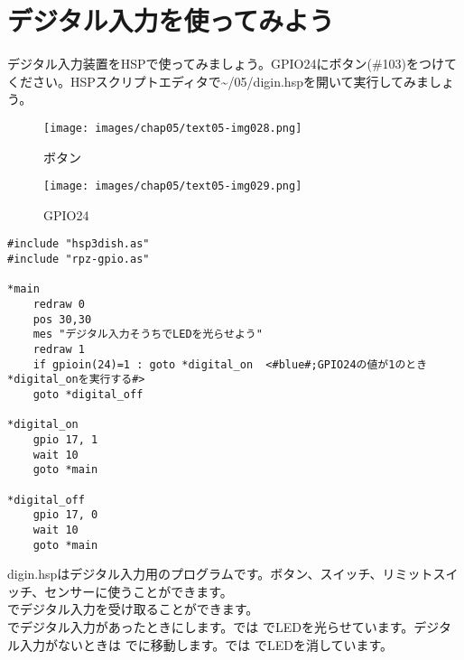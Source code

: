 \newpage
\section{デジタル入力を使ってみよう}
デジタル入力装置をHSPで使ってみましょう。GPIO24にボタン(\#103)をつけてください。HSPスクリプトエディタで\textasciitilde /05/digin.hspを開いて実行してみましょう。\\
\begin{figure}[H]
  \begin{minipage}[t]{0.3\columnwidth}
    \centering
 \texttt{[image: images/chap05/text05-img028.png]}
    \caption{ボタン}
  \end{minipage}
  \begin{minipage}[t]{0.5\columnwidth}
    \centering
    \texttt{[image: images/chap05/text05-img029.png]}
    \caption{GPIO24}
  \end{minipage}
\end{figure}

\begin{lstlisting}[caption=digout.hsp,label=digout.hsp]
#include "hsp3dish.as"
#include "rpz-gpio.as"

*main
	redraw 0
	pos 30,30
	mes "デジタル入力そうちでLEDを光らせよう"
	redraw 1
	if gpioin(24)=1 : goto *digital_on	<#blue#;GPIO24の値が1のとき*digital_onを実行する#>
	goto *digital_off
        
*digital_on
	gpio 17, 1
	wait 10
	goto *main

*digital_off
	gpio 17, 0
	wait 10
	goto *main
\end{lstlisting}

digin.hspはデジタル入力用のプログラムです。ボタン、スイッチ、リミットスイッチ、センサーに使うことができます。\\

でデジタル入力を受け取ることができます。\\

でデジタル入力があったときにします。では でLEDを光らせています。デジタル入力がないときは でに移動します。では でLEDを消しています。

\begin{tcolorbox}[title=\useOmetoi]
\begin{enumerate}
\end{enumerate}
\end{tcolorbox}

